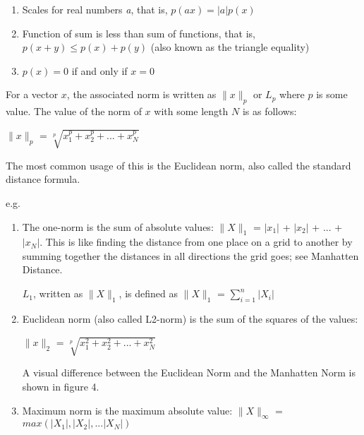 \documentclass[12pt]{article}
\begin{document}
\begin{enumerate}
    \item Scales for real numbers \textit{a}, that is, $p(ax) = \vert a \vert p(x)$
    \item Function of sum is less than sum of functions, that is, $p(x + y) \leq p(x) + p(y)$ (also known as the triangle equality)
    \item $p(x) = 0$ if and only if $x = 0$
\end{enumerate}

For a vector $x$, the associated norm is written as $\| x \|_p$ or $L_p$ where $p$ is some value. The value of the norm of $x$ with some length $N$ is as follows:

\begin{center}
    $\| x \|_p$ = $\sqrt[p]{x^p_1 + x^p_2 + ... + x^p_N}$
\end{center}

The most common usage of this is the Euclidean norm, also called the standard distance formula.

e.g. 

\begin{enumerate}
    \item The one-norm is the sum of absolute values: $\| X \|_1$ = $\vert x_1 \vert$ + $\vert x_2 \vert$ + $...$ + $\vert x_N \vert$. This is like finding the distance from one place on a grid to another by summing together the distances in all directions the grid goes; see Manhatten Distance.
    
    
    $L_1$, written as $\| X \|_1$, is defined as $\| X \|_1$ = $\sum\limits_{i=1}^{n} \vert X_i \vert$
    
    \item Euclidean norm (also called L2-norm) is the sum of the squares of the values:
    
    \begin{center}
        $\| x \|_2$ = $\sqrt[p]{x^2_1 + x^2_2 + ... + x^2_N}$
    \end{center}
    
    
    A visual difference between the Euclidean Norm and the Manhatten Norm is shown in figure 4.
    
    
    \item Maximum norm is the maximum absolute value: $\| X \|_\infty$ = $max(\vert X_1 \vert, \vert X_2 \vert, ... \vert X_N \vert)$
    
    
\end{enumerate}
\end{document}
